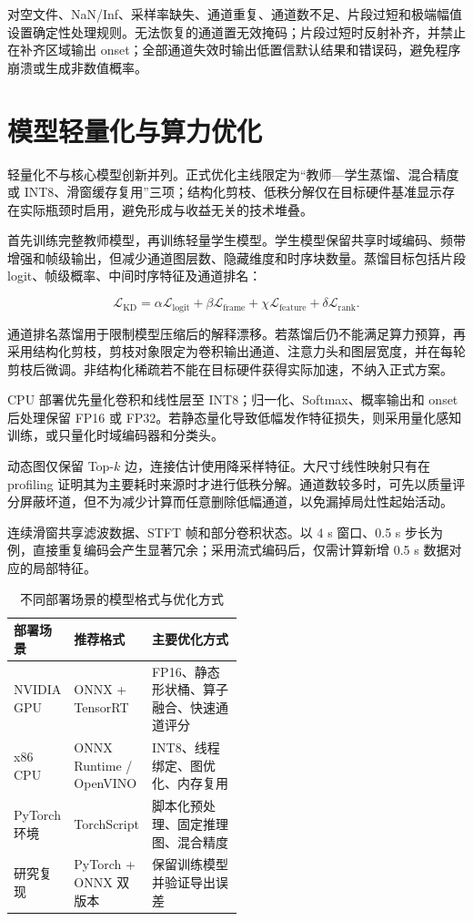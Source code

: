 对空文件、NaN/Inf、采样率缺失、通道重复、通道数不足、片段过短和极端幅值设置确定性处理规则。无法恢复的通道置无效掩码；片段过短时反射补齐，并禁止在补齐区域输出 onset；全部通道失效时输出低置信默认结果和错误码，避免程序崩溃或生成非数值概率。

\clearpage
\section{模型轻量化与算力优化}

轻量化不与核心模型创新并列。正式优化主线限定为“教师—学生蒸馏、混合精度或 INT8、滑窗缓存复用”三项；结构化剪枝、低秩分解仅在目标硬件基准显示存在实际瓶颈时启用，避免形成与收益无关的技术堆叠。

首先训练完整教师模型，再训练轻量学生模型。学生模型保留共享时域编码、频带增强和帧级输出，但减少通道图层数、隐藏维度和时序块数量。蒸馏目标包括片段 logit、帧级概率、中间时序特征及通道排名：

$$
\mathcal{L}_{\mathrm{KD}}=
\alpha\mathcal{L}_{\mathrm{logit}}
+\beta\mathcal{L}_{\mathrm{frame}}
+\chi\mathcal{L}_{\mathrm{feature}}
+\delta\mathcal{L}_{\mathrm{rank}}.
$$

通道排名蒸馏用于限制模型压缩后的解释漂移。若蒸馏后仍不能满足算力预算，再采用结构化剪枝，剪枝对象限定为卷积输出通道、注意力头和图层宽度，并在每轮剪枝后微调。非结构化稀疏若不能在目标硬件获得实际加速，不纳入正式方案。

CPU 部署优先量化卷积和线性层至 INT8；归一化、Softmax、概率输出和 onset 后处理保留 FP16 或 FP32。若静态量化导致低幅发作特征损失，则采用量化感知训练，或只量化时域编码器和分类头。

动态图仅保留 Top-$k$ 边，连接估计使用降采样特征。大尺寸线性映射只有在 profiling 证明其为主要耗时来源时才进行低秩分解。通道数较多时，可先以质量评分屏蔽坏道，但不为减少计算而任意删除低幅通道，以免漏掉局灶性起始活动。

连续滑窗共享滤波数据、STFT 帧和部分卷积状态。以 4 s 窗口、0.5 s 步长为例，直接重复编码会产生显著冗余；采用流式编码后，仅需计算新增 0.5 s 数据对应的局部特征。

\begin{table}[htbp]
    \centering
    \small
    \caption{不同部署场景的模型格式与优化方式}
    \label{tab:deployment}
    \renewcommand{\arraystretch}{1.25}
    \setlength{\tabcolsep}{3pt}
    \begin{tabularx}{\linewidth}{@{}p{0.22\linewidth}p{0.28\linewidth}X@{}}
        \toprule
        \textbf{部署场景} & \textbf{推荐格式} & \textbf{主要优化方式} \\
        \midrule
        NVIDIA GPU & ONNX + TensorRT & FP16、静态形状桶、算子融合、快速通道评分 \\
        x86 CPU & ONNX Runtime / OpenVINO & INT8、线程绑定、图优化、内存复用 \\
        PyTorch 环境 & TorchScript & 脚本化预处理、固定推理图、混合精度 \\
        研究复现 & PyTorch + ONNX 双版本 & 保留训练模型并验证导出误差 \\
        \bottomrule
    \end{tabularx}
\end{table}

